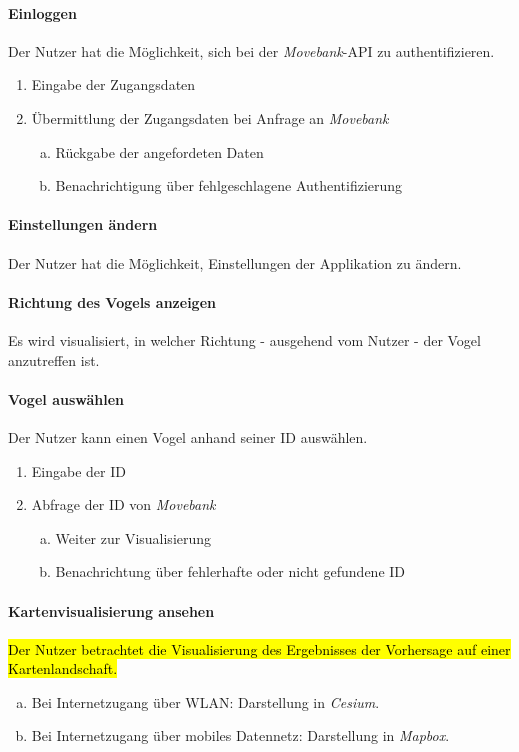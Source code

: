 \documentclass[12pt]{article} %
\newenvironment{cptenumerate}[1][label=\arabic*.]{\begin{enumerate}[#1] \setlength\itemsep{0em}}{\end{enumerate}}
\begin{document}
\paragraph{Einloggen} Der Nutzer hat die Möglichkeit, sich bei der \textit{Movebank}-API zu authentifizieren.
\begin{cptenumerate} 
  	 \item Eingabe der Zugangsdaten
  	 \item Übermittlung der Zugangsdaten bei Anfrage an \textit{Movebank}
  	 \begin{cptenumerate}[a.]
  	  	 \item Rückgabe der angefordeten Daten
  	  	 \item Benachrichtigung über fehlgeschlagene Authentifizierung
  	 \end{cptenumerate} 
 \end{cptenumerate}  

 \paragraph{Einstellungen ändern} Der Nutzer hat die Möglichkeit, Einstellungen der Applikation zu ändern.

 \paragraph{Richtung des Vogels anzeigen} Es wird visualisiert, in welcher Richtung - ausgehend vom Nutzer - der Vogel anzutreffen ist.

 \paragraph{Vogel auswählen} Der Nutzer kann einen Vogel anhand seiner ID auswählen.
 \begin{cptenumerate} 
     	 \item Eingabe der ID
     	 \item Abfrage der ID von \textit{Movebank}
     	 \begin{cptenumerate}[a.]
     	   	 \item Weiter zur Visualisierung
     	   	 \item Benachrichtung über fehlerhafte oder nicht gefundene ID
     	  \end{cptenumerate}  
    \end{cptenumerate}    

\paragraph{Kartenvisualisierung ansehen} \hl{Der Nutzer betrachtet die Visualisierung des Ergebnisses der Vorhersage auf einer Kartenlandschaft.} 
\begin{cptenumerate}[a.]
 	 \item Bei Internetzugang über WLAN: Darstellung in \textit{Cesium}.
 	 \item Bei Internetzugang über mobiles Datennetz: Darstellung in \textit{Mapbox}. 
\end{cptenumerate}
\end{document}
